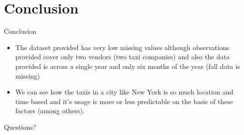 \documentclass[
 size=14pt,
 paper=smartboard,  %
 mode=present, 		%
 display=slides, 	%
 style=tuliplab,  	%
 pauseslide,
 fleqn,leqno]{powerdot}
\begin{document}











\section{Conclusion}

\begin{slide}{Conclusion}
\begin{itemize}
\item
The dataset provided has very low missing values although observations provided cover only two vendors (two taxi companies) and also the data provided is across a single year and only six months of the year (fall data is missing)
\vspace{1cm}
\item
We can see how the taxis in a city like New York is so much location and time based and it's usage is more or less predictable on the basis of these factors (among others).
\end{itemize}



\end{slide}


%
\begin{slide}[toc=,bm=]{Questions?}
\begin{center}
\begin{figure}
\end{figure}
\end{center}
\end{slide}
\end{document}

